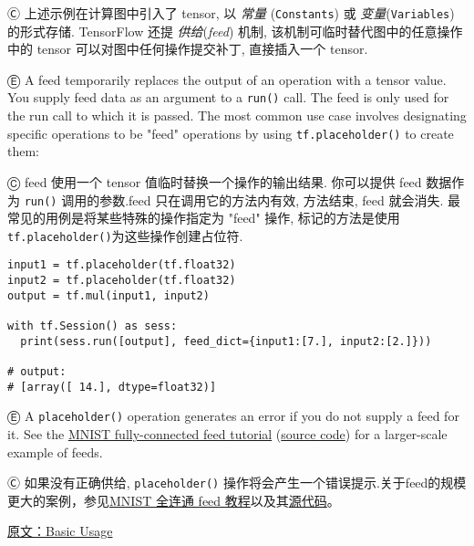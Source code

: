Ⓒ 上述示例在计算图中引入了 tensor, 以 \emph{常量} (\lstinline{Constants}) 或 \emph{变量}(\lstinline{Variables}) 的形式存储. TensorFlow 还提 \emph{供给}(\emph{feed}) 机制, 该机制可临时替代图中的任意操作中的 tensor 可以对图中任何操作提交补丁, 直接插入一个 tensor.

Ⓔ \textcolor{etc}{A feed temporarily replaces the output of an operation with a tensor value. You supply feed data as an argument to a \lstinline{run()} call. The feed is only used for the run call to which it is passed. The most common use case involves designating specific operations to be "feed" operations by using \lstinline{tf.placeholder()} to create them:}

Ⓒ feed 使用一个 tensor 值临时替换一个操作的输出结果. 你可以提供 feed 数据作为 \lstinline {run()} 调用的参数.feed 只在调用它的方法内有效, 方法结束, feed 就会消失. 最常见的用例是将某些特殊的操作指定为 "feed" 操作, 标记的方法是使用\lstinline{tf.placeholder()}为这些操作创建占位符.

\begin{lstlisting}
input1 = tf.placeholder(tf.float32)
input2 = tf.placeholder(tf.float32)
output = tf.mul(input1, input2)

with tf.Session() as sess:
  print(sess.run([output], feed_dict={input1:[7.], input2:[2.]}))

# output:
# [array([ 14.], dtype=float32)]
\end{lstlisting}

Ⓔ \textcolor{etc}{A \lstinline{placeholder()} operation generates an error if you do not supply a feed for it. See the \hyperref[minist_tf]{MNIST fully-connected feed tutorial} (\href{https://tensorflow.googlesource.com/tensorflow/+/master/tensorflow/g3doc/tutorials/mnist/fully_connected_feed.py}{source code}) for a larger-scale example of feeds.}

Ⓒ 如果没有正确供给, \lstinline{placeholder()} 操作将会产生一个错误提示.关于feed的规模更大的案例，参见\hyperref[minist_tf]{MNIST 全连通 feed 教程}以及其\href{https://tensorflow.googlesource.com/tensorflow/+/master/tensorflow/g3doc/tutorials/mnist/fully_connected_feed.py}{源代码}。

\href{http://tensorflow.org/get_started/basic_usage.md}{原文：Basic Usage}